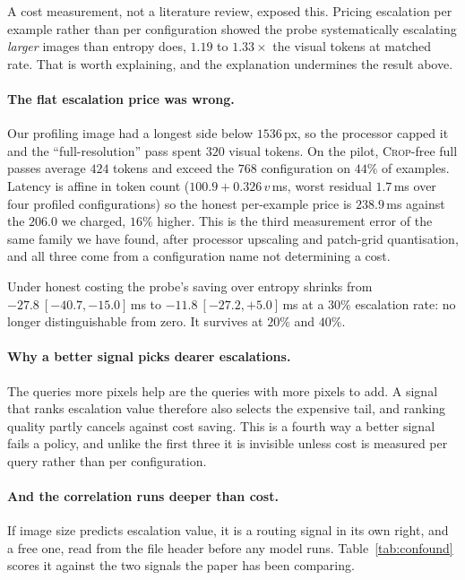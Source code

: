 \documentclass[10pt,twocolumn]{article}
\theoremstyle{plain}
\newcommand{\crop}{\textsc{Crop}}
\begin{document}
A cost measurement, not a literature review, exposed this. Pricing escalation
per example rather than per configuration showed the probe systematically
escalating \emph{larger} images than entropy does, $1.19$ to $1.33\times$ the
visual tokens at matched rate. That is worth explaining, and the explanation
undermines the result above.

\paragraph{The flat escalation price was wrong.} Our profiling image had a
longest side below $1536$\,px, so the processor capped it and the
``full-resolution'' pass spent $320$ visual tokens. On the pilot, \crop{}-free
full passes average $424$ tokens and exceed the $768$ configuration on $44\%$ of
examples. Latency is affine in token count ($100.9 + 0.326\,v$\,ms, worst residual $1.7$\,ms over four profiled configurations) so the honest per-example
price is $238.9$\,ms against the $206.0$ we charged, $16\%$ higher. This is the
third measurement error of the same family we have found, after processor
upscaling and patch-grid quantisation, and all three come from a configuration
name not determining a cost.

Under honest costing the probe's saving over entropy shrinks from
$-27.8\ [-40.7,-15.0]$\,ms to $-11.8\ [-27.2,+5.0]$\,ms at a $30\%$ escalation
rate: no longer distinguishable from zero. It survives at $20\%$ and $40\%$.

\paragraph{Why a better signal picks dearer escalations.} The queries more
pixels help are the queries with more pixels to add. A signal that ranks
escalation value therefore also selects the expensive tail, and ranking quality
partly cancels against cost saving. This is a fourth way a better signal fails a
policy, and unlike the first three it is invisible unless cost is measured per
query rather than per configuration.

\paragraph{And the correlation runs deeper than cost.} If image size predicts
escalation value, it is a routing signal in its own right, and a free one, read
from the file header before any model runs. Table~\ref{tab:confound} scores it
against the two signals the paper has been comparing.
\end{document}
